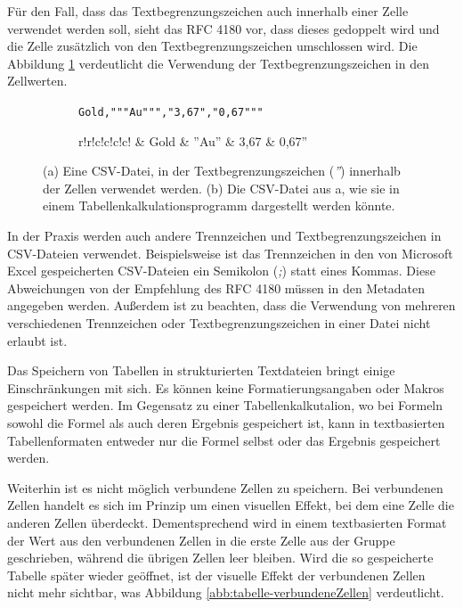 Für den Fall, dass das Textbegrenzungszeichen auch innerhalb einer Zelle verwendet werden soll, sieht das RFC 4180 vor, dass dieses gedoppelt wird und die Zelle zusätzlich von den Textbegrenzungszeichen umschlossen wird. Die Abbildung \ref{abb:tabelle-csv-textbegrenzungszeichen} verdeutlicht die Verwendung der Textbegrenzungszeichen in den Zellwerten.

\begin{figure}[!hbt]
\begin{subfigure}{.3\textwidth}
{\scriptsize
\verb||
\verb|Gold,"""Au""","3,67","0,67"""|\\
}
  \caption{}
\end{subfigure}\hspace{1.3cm}
\begin{subfigure}{.3\textwidth}
\footnotesize
  \begin{tabular}{r!\tbg r!\tbg c!\tbg c!\tbg c!\tbg c!\tbg}
		& Gold & ''Au'' & 3,67 & 0,67'' \\
	\end{tabular}
  \caption{}
\end{subfigure}
\caption{(a) Eine CSV-Datei, in der Textbegrenzungszeichen (\emph{''}) innerhalb der Zellen verwendet werden. (b) Die CSV-Datei aus a, wie sie in einem Tabellenkalkulationsprogramm dargestellt werden könnte.}
\label{abb:tabelle-csv-textbegrenzungszeichen}
\end{figure}

In der Praxis werden auch andere Trennzeichen und Textbegrenzungszeichen in CSV-Dateien verwendet. Beispielsweise ist das Trennzeichen in den von Microsoft Excel gespeicherten CSV-Dateien ein Semikolon (\emph{;}) statt eines Kommas. Diese Abweichungen von der Empfehlung des RFC 4180 müssen in den Metadaten angegeben werden. Außerdem ist zu beachten, dass die Verwendung von mehreren verschiedenen Trennzeichen oder Textbegrenzungszeichen in einer Datei nicht erlaubt ist.

Das Speichern von Tabellen in strukturierten Textdateien bringt einige Einschränkungen mit sich. Es können keine Formatierungsangaben oder Makros gespeichert werden. Im Gegensatz zu einer Tabellenkalkutalion, wo bei Formeln sowohl die Formel als auch deren Ergebnis gespeichert ist, kann in textbasierten Tabellenformaten entweder nur die Formel selbst oder das Ergebnis gespeichert werden.

Weiterhin ist es nicht möglich verbundene Zellen zu speichern. Bei verbundenen Zellen handelt es sich im Prinzip um einen visuellen Effekt, bei dem eine Zelle die anderen Zellen überdeckt. Dementsprechend wird in einem textbasierten Format der Wert aus den verbundenen Zellen in die erste Zelle aus der Gruppe geschrieben, während die übrigen Zellen leer bleiben. Wird die so gespeicherte Tabelle später wieder geöffnet, ist der visuelle Effekt der verbundenen Zellen nicht mehr sichtbar, was Abbildung \ref{abb:tabelle-verbundeneZellen} verdeutlicht.

